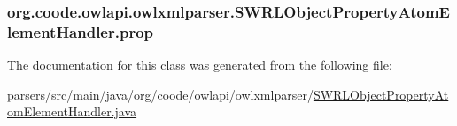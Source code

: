 \hypertarget{classorg_1_1coode_1_1owlapi_1_1owlxmlparser_1_1_s_w_r_l_object_property_atom_element_handler_a5273ccaabeaf08ac1299fe39c29f49e3}{
\subsubsection[{prop}]{ org.\-coode.\-owlapi.\-owlxmlparser.\-S\-W\-R\-L\-Object\-Property\-Atom\-Element\-Handler.\-prop\hspace{0.3cm}{\ttfamily [private]}}}\label{classorg_1_1coode_1_1owlapi_1_1owlxmlparser_1_1_s_w_r_l_object_property_atom_element_handler_a5273ccaabeaf08ac1299fe39c29f49e3}


The documentation for this class was generated from the following file\-:\begin{DoxyCompactItemize}
\item 
parsers/src/main/java/org/coode/owlapi/owlxmlparser/\hyperlink{_s_w_r_l_object_property_atom_element_handler_8java}{S\-W\-R\-L\-Object\-Property\-Atom\-Element\-Handler.\-java}\end{DoxyCompactItemize}
